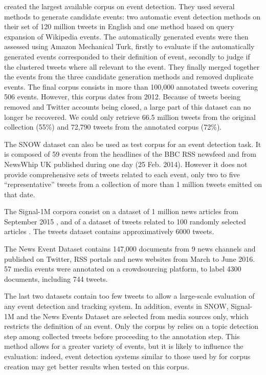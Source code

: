 \citet{mcminn_building_2013} created the largest available corpus on event detection. They used several methods to generate candidate events: two automatic event detection methods on their set of 120 million tweets in English and one method based on query expansion of Wikipedia events. The automatically generated events were then assessed using Amazon Mechanical Turk, firstly to evaluate if the automatically generated events corresponded to their definition of event, secondly to judge if the clustered tweets where all relevant to the event. They finally merged together the events from the three candidate generation methods and removed duplicate events. The final corpus consists in more than 100,000 annotated tweets covering 506 events. However, this corpus dates from 2012. Because of tweets beeing removed and Twitter accounts being closed, a large part of this dataset can no longer be recovered. We could only retrieve 66.5 million tweets from the original collection (55\%) and 72,790 tweets from  the annotated corpus (72\%).

The SNOW dataset \citep{papadopoulos_snow_2014} can also be used as test corpus for an event detection task. It is composed of 59 events from the headlines of the BBC RSS newsfeed and from NewsWhip UK published during one day (25 Feb. 2014). However it does not provide comprehensive sets of tweets related to each event, only two to five “representative” tweets from a collection of more than 1 million tweets emitted on that date.

The Signal-1M corpora consist on a dataset of 1 million news articles from September 2015 \citep{corney2016million}, and of a dataset of tweets related to 100 randomly selected articles \citep{suarez2018data}. The tweets dataset contains approximatively 6000 tweets.

The News Event Dataset \citep{mele2019multi} contains 147,000 documents from 9 news channels and published on Twitter, RSS portals and news websites from March to June 2016. 57 media events were annotated on a crowdsourcing platform, to label 4300 documents, including 744 tweets.

The last two datasets contain too few tweets to allow a large-scale evaluation of any event detection and tracking system. In addition, events in SNOW, Signal-1M and the News Events Dataset are selected from media sources only, which restricts the definition of an event. Only the corpus by \citet{mcminn_building_2013} relies on a topic detection step among collected tweets before proceeding to the annotation step. This method allows for a greater variety of events, but it is likely to influence the evaluation: indeed, event detection systems similar to those used by \citet{mcminn_building_2013} for corpus creation may get better results when tested on this corpus.

